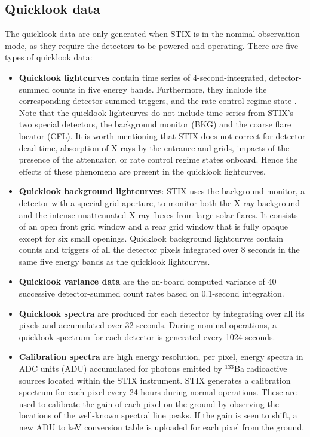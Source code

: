 \documentclass[referee]{aa} %
\begin{document}
\subsection{Quicklook data}
The quicklook data are only generated when STIX is in the nominal observation mode, as they require the detectors to be powered and operating. There are five types of quicklook data:
\begin{itemize}
\item {\bf Quicklook lightcurves} contain time series of 4-second-integrated,  detector-summed counts in five energy bands.  Furthermore, they include the corresponding detector-summed triggers, and the rate control regime state \citep[i.e., attenutator state. See ][]{stix2020}.  Note that the quicklook lightcurves do not include time-series from STIX's two special detectors, the background monitor (BKG) and the coarse flare locator (CFL). 
It is worth mentioning that STIX does not correct for detector dead time, absorption of X-rays by the entrance and grids,
impacts of the presence of the attenuator,  or rate control regime states onboard.
Hence the effects of these phenomena are present in the quicklook lightcurves.

\item {\bf Quicklook background lightcurves}: STIX uses the background monitor, a detector with a special grid aperture, to monitor both the X-ray background and the intense unattenuated X-ray fluxes from large solar flares. It consists of an open front grid window and a rear grid window that is fully opaque except for six small openings. Quicklook background lightcurves contain counts and triggers of all the detector pixels integrated over 8 seconds in the same five energy bands as the quicklook lightcurves. 

\item {\bf Quicklook variance data} are the on-board computed variance of 40 successive 
detector-summed count rates based on 0.1-second integration.

\item {\bf Quicklook spectra} are produced for each detector by integrating over all its pixels and accumulated over 32 seconds. During nominal operations, a quicklook spectrum for each detector is generated every 1024 seconds.

\item {\bf Calibration spectra} are high energy resolution, per pixel, energy spectra in ADC units (ADU) accumulated for photons emitted by $^{133}$Ba radioactive sources located within the STIX instrument. 
STIX generates a calibration spectrum for each pixel every 24 hours during normal operations. These are used to calibrate the gain of each pixel on the ground by observing the locations of the well-known spectral line peaks. 
If the gain is seen to shift, a new ADU to keV conversion table is uploaded for each pixel from the ground. 
\end{itemize}
\end{document}
